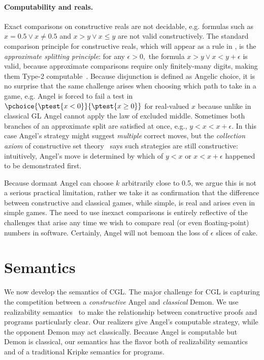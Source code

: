 \documentclass[12pt]{cmuthesis}
\theoremstyle{definition}
\theoremstyle{remark}
\newcommand{\rref}[2][]{\prettyref{#2}}
\newcommand{\CGL}{\textsf{CGL}\xspace}
\newcommand{\GL}{GL\xspace}
\begin{document}
\paragraph{Computability and reals.}
Exact comparisons on constructive reals are not decidable, e.g. formulas such as $x = 0.5 \lor x \neq 0.5$ and $x > y \lor x \leq y$ are not valid constructively.
The standard comparison principle for constructive reals, which will appear as a rule in \rref{sec:arith-proof}, is the \emph{approximate splitting principle}:
for any $\epsilon > 0,$ the formula $x > y \lor x < y + \epsilon$ is valid, because approximate comparisons require only finitely-many digits, making them Type-2 computable~\cite{DBLP:series/txtcs/Weihrauch00}.
Because disjunction is defined as Angelic choice, it is no surprise that the same challenge arises when choosing which path to take in a game, e.g. Angel is forced to fail a test in $\pchoice{\ptest{x < 0}}{\ptest{x \geq 0}}$ for real-valued $x$ because unlike in classical \GL Angel cannot apply the law of excluded middle.
Sometimes both branches of an approximate split are satisfied at once, e.g., $y < x < x + \epsilon$.
In this case Angel's strategy might suggest \emph{multiple} correct moves, but the \emph{collection axiom} of constructive set theory~\cite{DBLP:journals/mst/Schwichtenberg08,bishop1967foundations,bridges2007techniques} says such strategies are still constructive: intuitively, Angel's move is determined by which of $y < x$ or $x < x + \epsilon$ happened to be demonstrated first.

Because dormant Angel can choose $k$ arbitrarily close to 0.5, we argue this is not a serious practical limitation, rather we take it as confirmation that the difference between constructive and classical games, while simple, is real and arises even in simple games.
The need to use inexact comparisons is entirely reflective of the challenges that arise any time we wish to compare real (or even floating-point) numbers in software.
Certainly, Angel will not bemoan the loss of $\epsilon$ slices of cake.





\section{Semantics}
\label{sec:rel-sem}
We now develop the semantics of \CGL.
The major  challenge for \CGL is capturing the competition between a \emph{constructive} Angel and \emph{classical} Demon.
We use realizability semantics~\cite{DBLP:journals/mscs/Oosten02,lipton1992constructive} to make the relationship between constructive proofs and programs particularly clear.
Our realizers give Angel's computable strategy, while the opponent Demon may act classically.
Because Angel is computable but Demon is classical, our semantics has the flavor both of realizability semantics and of a traditional Kripke semantics for programs.
\end{document}
